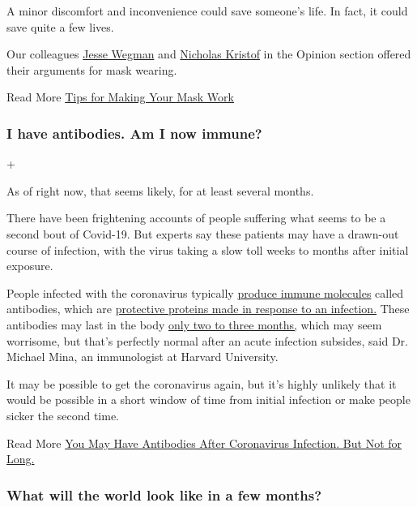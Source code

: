 A minor discomfort and inconvenience could save someone's life. In fact,
it could save quite a few lives.

Our colleagues
\href{https://www.nytimes3xbfgragh.onion/2020/07/02/opinion/coronavirus-masks.html}{Jesse
Wegman} and
\href{https://www.nytimes3xbfgragh.onion/2020/07/01/opinion/coronavirus-face-masks.html?action=click\&module=RelatedLinks\&pgtype=Article}{Nicholas
Kristof} in the Opinion section offered their arguments for mask
wearing.

 Read More
\href{https://www.nytimes3xbfgragh.onion/interactive/2020/06/25/burst/how-to-get-the-most-out-of-your-mask.html}{Tips
for Making Your Mask Work}

\hypertarget{i-have-antibodies-am-i-now-immune}{%
\subsubsection{I have antibodies. Am I now
immune?}\label{i-have-antibodies-am-i-now-immune}}

+

As of right now, that seems likely, for at least several months.

There have been frightening accounts of people suffering what seems to
be a second bout of Covid-19. But experts say these patients may have a
drawn-out course of infection, with the virus taking a slow toll weeks
to months after initial exposure.

People infected with the coronavirus typically
\href{https://www.nature.com/articles/s41586-020-2456-9}{produce immune
molecules} called antibodies, which are
\href{https://www.nytimes3xbfgragh.onion/2020/05/07/health/coronavirus-antibody-prevalence.html}{protective
proteins made in response to an infection.} These antibodies may last in
the body \href{https://www.nature.com/articles/s41591-020-0965-6}{only
two to three months,} which may seem worrisome, but that's perfectly
normal after an acute infection subsides, said Dr. Michael Mina, an
immunologist at Harvard University.

It may be possible to get the coronavirus again, but it's highly
unlikely that it would be possible in a short window of time from
initial infection or make people sicker the second time.

 Read More
\href{https://www.nytimes3xbfgragh.onion/2020/07/22/health/covid-antibodies-herd-immunity.html}{You
May Have Antibodies After Coronavirus Infection. But Not for Long.}

\hypertarget{what-will-the-world-look-like-in-a-few-months}{%
\subsubsection{What will the world look like in a few
months?}\label{what-will-the-world-look-like-in-a-few-months}}

